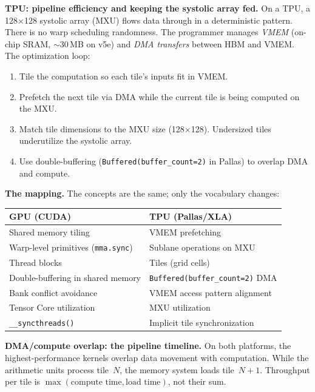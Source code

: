 \textbf{TPU: pipeline efficiency and keeping the systolic array fed.} On a TPU, a 128$\times$128 systolic array (MXU) flows data through in a deterministic pattern. There is no warp scheduling randomness. The programmer manages \textit{VMEM} (on-chip SRAM, $\sim$30\,MB on v5e) and \textit{DMA transfers} between HBM and VMEM. The optimization loop:
\begin{enumerate}
  \item Tile the computation so each tile's inputs fit in VMEM.
  \item Prefetch the next tile via DMA while the current tile is being computed on the MXU.
  \item Match tile dimensions to the MXU size (128$\times$128). Undersized tiles underutilize the systolic array.
  \item Use double-buffering (\texttt{Buffered(buffer\_count=2)} in Pallas) to overlap DMA and compute.
\end{enumerate}

\textbf{The mapping.} The concepts are the same; only the vocabulary changes:

\begin{center}
\small
\begin{tabular}{@{}ll@{}}
\toprule
\textbf{GPU (CUDA)} & \textbf{TPU (Pallas/XLA)} \\
\midrule
Shared memory tiling & VMEM prefetching \\
Warp-level primitives (\texttt{mma.sync}) & Sublane operations on MXU \\
Thread blocks & Tiles (grid cells) \\
Double-buffering in shared memory & \texttt{Buffered(buffer\_count=2)} DMA \\
Bank conflict avoidance & VMEM access pattern alignment \\
Tensor Core utilization & MXU utilization \\
\texttt{\_\_syncthreads()} & Implicit tile synchronization \\
\bottomrule
\end{tabular}
\end{center}

\medskip

\textbf{DMA/compute overlap: the pipeline timeline.} On both platforms, the highest-performance kernels overlap data movement with computation. While the arithmetic units process tile~$N$, the memory system loads tile~$N{+}1$. Throughput per tile is $\max(\text{compute time}, \text{load time})$, not their sum.

